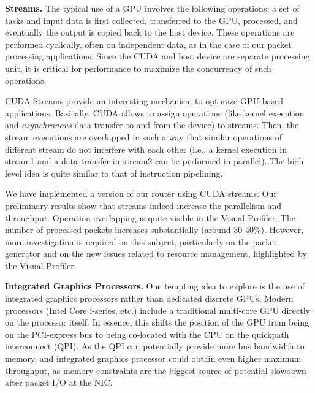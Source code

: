 \medskip \noindent \textbf{Streams.} The typical use of a GPU involves the
following operations: a set of tasks and input data is first collected,
transferred to the GPU, processed, and eventually the output is copied back to
the host device. These operations are performed cyclically, often on
independent data, as in the case of our packet processing applications. Since
the CUDA and host device are separate processing unit, it is critical for
performance to maximize the concurrency of such operations.

CUDA Streams provide an interesting mechanism to optimize GPU-based
applications. Basically, CUDA allows to assign operations (like kernel
execution and \emph{asynchronous} data transfer to and from the device) to
streams. Then, the stream executions are overlapped in such a way that similar
operations of different stream do not interfere with each other (i.e., a kernel
execution in stream1 and a data transfer in stream2 can be performed in
parallel). The high level idea is quite similar to that of instruction
pipelining.

We have implemented a version of our router using CUDA streams. Our preliminary
results show that streams indeed increase the parallelism and throughput.
Operation overlapping is quite visible in the Visual Profiler. The number of
processed packets increases substantially (around 30-40\%). However, more
investigation is required on this subject, particularly on the packet generator
and on the new issues related to resource management, highlighted by the Visual
Profiler.


\medskip \noindent \textbf{Integrated Graphics Processors.} One tempting idea
to explore is the use of integrated graphics processors rather than dedicated
discrete GPUs. Modern processors (Intel Core i-series, etc.) include a
traditional multi-core GPU directly on the processor itself. In essence, this
shifts the position of the GPU from being on the PCI-express bus to being
co-located with the CPU on the quickpath interconnect (QPI). As the QPI can
potentially provide more bus bandwidth to memory, and integrated graphics
processor could obtain even higher maximum throughput, as memory constraints
are the biggest source of potential slowdown after packet I/O at the NIC.
